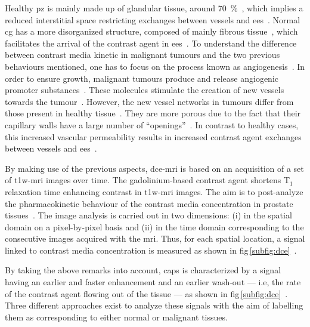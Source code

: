 Healthy \ac{pz} is mainly made up of glandular tissue, around
\SI{70}{\percent}~\cite{Choi2007}, which implies a reduced interstitial space
restricting exchanges between vessels and
\ac{ees}~\cite{Buckley2004,Niekerk2009}.
Normal \ac{cg} has a more disorganized structure, composed of mainly fibrous
tissue~\cite{Choi2007,Hoeks2011}, which facilitates the arrival of the contrast
agent in \ac{ees}~\cite{Niekerk2013}.
To understand the difference between contrast media kinetic in malignant
tumours and the two previous behaviours mentioned, one has to focus on the
process known as angiogenesis~\cite{Carmeliet2000}.
In order to ensure growth, malignant tumours produce and release angiogenic
promoter substances~\cite{Carmeliet2000}.
These molecules stimulate the creation of new vessels towards the
tumour~\cite{Carmeliet2000}.
However, the new vessel networks in tumours differ from those present in
healthy tissue~\cite{Gribbestad2005}.
They are more porous due to the fact that their capillary walls have a large
number of ``openings''~\cite{Gribbestad2005,Choi2007}.
In contrast to healthy cases, this increased vascular permeability results in
increased contrast agent exchanges between vessels and
\ac{ees}~\cite{Verma2012}.

By making use of the previous aspects, \ac{dce}-\ac{mri} is based on an
acquisition of a set of \ac{t1w}-\ac{mri} images over time.
The gadolinium-based contrast agent shortens T$_1$ relaxation time enhancing
contrast in \ac{t1w}-\ac{mri} images.
The aim is to post-analyze the pharmacokinetic behaviour of the contrast media
concentration in prostate tissues~\cite{Verma2012}.
The image analysis is carried out in two dimensions: (i) in the spatial domain
on a pixel-by-pixel basis and (ii) in the time domain corresponding to the
consecutive images acquired with the \ac{mri}.
Thus, for each spatial location, a signal linked to contrast media
concentration is measured as shown in
\acs{fig}\,\ref{subfig:dce}~\cite{Tofts2010}.

By taking the above remarks into account, \acp{cap} is characterized by a
signal having an earlier and faster enhancement and an earlier wash-out ---
i.e, the rate of the contrast agent flowing out of the tissue --- as shown in
\acs{fig}\,\ref{subfig:dce}~\cite{Verma2012}.
Three different approaches exist to analyze these signals with the aim of
labelling them as corresponding to either normal or malignant tissues.

